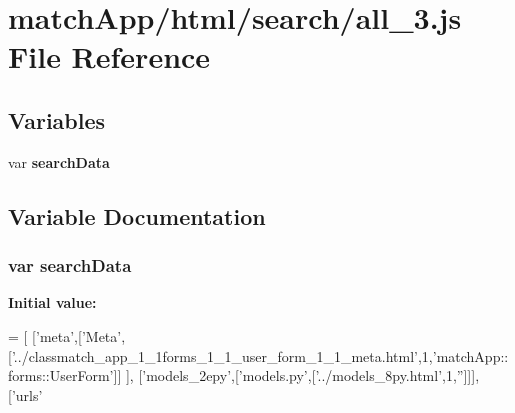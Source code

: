 \section{match\+App/html/search/all\+\_\+3.js File Reference}
\label{all__3_8js}
\subsection*{Variables}
\begin{DoxyCompactItemize}
\item 
var {\bf search\+Data}
\end{DoxyCompactItemize}


\subsection{Variable Documentation}
\subsubsection[{search\+Data}]{\setlength{\rightskip}{0pt plus 5cm}var search\+Data}\label{all__3_8js_ad01a7523f103d6242ef9b0451861231e}
{\bfseries Initial value\+:}
\begin{DoxyCode}
=
[
  [\textcolor{stringliteral}{'meta'},[\textcolor{stringliteral}{'Meta'},[\textcolor{stringliteral}{'../classmatch\_app\_1\_1forms\_1\_1\_user\_form\_1\_1\_meta.html'},1,\textcolor{stringliteral}{'matchApp::forms::UserForm'}]]
      ],
  [\textcolor{stringliteral}{'models\_2epy'},[\textcolor{stringliteral}{'models.py'},[\textcolor{stringliteral}{'../models\_8py.html'},1,\textcolor{stringliteral}{''}]]],
  [\textcolor{stringliteral}{'urls'}
\end{DoxyCode}
